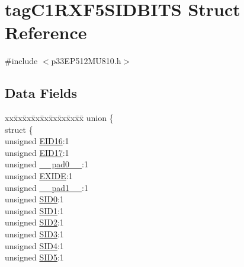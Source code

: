 \hypertarget{structtag_c1_r_x_f5_s_i_d_b_i_t_s}{}\section{tag\+C1\+R\+X\+F5\+S\+I\+D\+B\+I\+TS Struct Reference}
\label{structtag_c1_r_x_f5_s_i_d_b_i_t_s}


{\ttfamily \#include $<$p33\+E\+P512\+M\+U810.\+h$>$}

\subsection*{Data Fields}
\begin{DoxyCompactItemize}
\item 
\begin{tabbing}
xx\=xx\=xx\=xx\=xx\=xx\=xx\=xx\=xx\=\kill
union \{\\
\>struct \{\\
\>\>unsigned \hyperlink{structtag_c1_r_x_f5_s_i_d_b_i_t_s_a6dd5663b0c9838c56db040560ca0efa1}{EID16}:1\\
\>\>unsigned \hyperlink{structtag_c1_r_x_f5_s_i_d_b_i_t_s_aa648615464b0eb29967529333eee9fd9}{EID17}:1\\
\>\>unsigned \hyperlink{structtag_c1_r_x_f5_s_i_d_b_i_t_s_adf71f3d8410c1f1dbbc96680a92c49af}{\_\_pad0\_\_}:1\\
\>\>unsigned \hyperlink{structtag_c1_r_x_f5_s_i_d_b_i_t_s_a09ff1c1be3927220bd3dfbc10edfe243}{EXIDE}:1\\
\>\>unsigned \hyperlink{structtag_c1_r_x_f5_s_i_d_b_i_t_s_acaf2d0924a107ec6e8d2e31febaf66f9}{\_\_pad1\_\_}:1\\
\>\>unsigned \hyperlink{structtag_c1_r_x_f5_s_i_d_b_i_t_s_a1ca276ac15df60e1f7b9a6d0011ade93}{SID0}:1\\
\>\>unsigned \hyperlink{structtag_c1_r_x_f5_s_i_d_b_i_t_s_a3405d354f81391f879648f69f504dfc8}{SID1}:1\\
\>\>unsigned \hyperlink{structtag_c1_r_x_f5_s_i_d_b_i_t_s_ad744966dfc49307f731b7045b01b94e5}{SID2}:1\\
\>\>unsigned \hyperlink{structtag_c1_r_x_f5_s_i_d_b_i_t_s_a9345f3e64720be93e83d8dfc827f3f45}{SID3}:1\\
\>\>unsigned \hyperlink{structtag_c1_r_x_f5_s_i_d_b_i_t_s_aefb106fed4bb40e2c3c71ac612c554e3}{SID4}:1\\
\>\>unsigned \hyperlink{structtag_c1_r_x_f5_s_i_d_b_i_t_s_a0f221b3c9612231686bf87ccdcec8489}{SID5}:1\\

\end{tabbing}
\end{DoxyCompactItemize}
